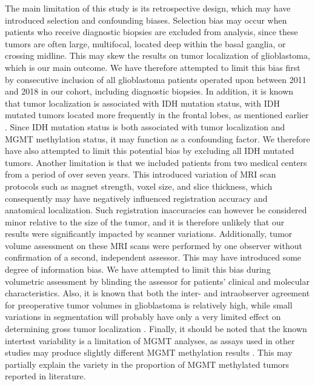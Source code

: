 The main limitation of this study is its retrospective design, which may have introduced selection and confounding biases.
Selection bias may occur when patients who receive diagnostic biopsies are excluded from analysis, since these \glspl{tumor} are often large, multifocal, located deep within the basal ganglia, or crossing midline.
This may skew the results on \gls{tumor} localization of glioblastoma, which is our main outcome.
We have therefore attempted to limit this bias first by consecutive inclusion of all glioblastoma patients operated upon between 2011 and 2018 in our cohort, including diagnostic biopsies.
In addition, it is known that \gls{tumor} localization is associated with \gls{IDH} mutation status, with \gls{IDH} mutated \glspl{tumor} located more frequently in the frontal lobes, as mentioned earlier \autocite{lai2011evidence}.
Since \gls{IDH} mutation status is both associated with \gls{tumor} localization and \gls{MGMT} methylation status, it may function as a confounding factor.
We therefore have also attempted to limit this potential bias by excluding all \gls{IDH} mutated \glspl{tumor}.
Another limitation is that we included patients from two medical centers from a period of over seven years.
This introduced variation of \gls{MRI} scan protocols such as magnet strength, voxel size, and slice thickness, which consequently may have negatively influenced registration accuracy and anatomical localization.
Such registration inaccuracies can however be considered minor relative to the size of the \gls{tumor}, and it is therefore unlikely that our results were significantly impacted by scanner variations.
Additionally, \gls{tumor} volume assessment on these \gls{MRI} scans were performed by one observer without confirmation of a second, independent assessor.
This may have introduced some degree of information bias.
We have attempted to limit this bias during volumetric assessment by blinding the assessor for patients' clinical and molecular characteristics.
Also, it is known that both the inter- and intraobserver agreement for preoperative \gls{tumor} volumes in glioblastoma is relatively high, while small variations in segmentation will probably have only a very limited effect on determining gross \gls{tumor} localization \autocite{kubben2010intraobserver}.
Finally, it should be noted that the known intertest variability is a limitation of \gls{MGMT} analyses, as assays used in other studies may produce slightly different \gls{MGMT} methylation results \autocite{wick2014mgmt}.
This may partially explain the variety in the proportion of \gls{MGMT} methylated \glspl{tumor} reported in literature.

